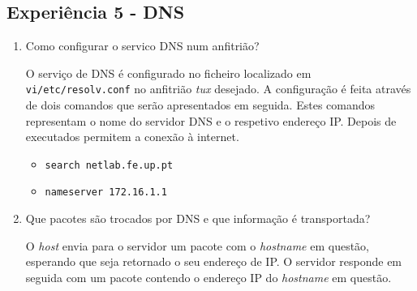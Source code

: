 \documentclass{article}
\begin{document}
\subsection{Experiência 5 - DNS}
\begin{enumerate}
\item Como configurar o servico DNS num anfitrião?

O serviço de DNS é configurado no ficheiro localizado em \texttt{vi/etc/resolv.conf} no anfitrião \textit{tux} desejado.
A configuração é feita através de dois comandos que serão apresentados em seguida. Estes comandos representam o nome do servidor DNS e o respetivo endereço IP. Depois de executados permitem a conexão à internet.
\begin{itemize}
    \item \texttt{search netlab.fe.up.pt}
    \item \texttt{nameserver 172.16.1.1}
\end{itemize}

\item Que pacotes são trocados por DNS e que informação é transportada?

O \textit{host} envia para o servidor um pacote com o \textit{hostname} em questão, esperando que seja retornado o seu endereço de IP.
O servidor responde em seguida com um pacote contendo o endereço IP do \textit{hostname} em questão.

\end{enumerate}
\end{document}
